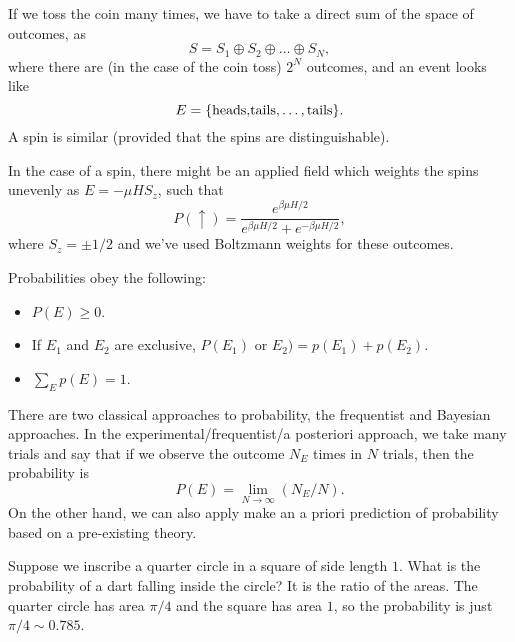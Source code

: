 If we toss the coin many times, we have to take a direct sum of the space of outcomes, as
\begin{equation}
    S=S_1 \oplus S_2 \oplus \dots \oplus S_N,
\end{equation}
where there are (in the case of the coin toss) $2^N$ outcomes, and an event looks like
\begin{equation}
    E=\{\text{heads,tails,}\dots,\text{tails}\}.
\end{equation}
A spin is similar (provided that the spins are distinguishable).

In the case of a spin, there might be an applied field which weights the spins unevenly as $E=-\mu HS_z$, such that
\begin{equation}
    P(\uparrow) = \frac{e^{\beta \mu H/2}}{e^{\beta \mu H/2} + e^{-\beta \mu H/2}},
\end{equation}
where $S_z=\pm 1/2$ and we've used Boltzmann weights for these outcomes.

Probabilities obey the following:
\begin{itemize}
    \item $P(E)\geq 0$.
    \item If $E_1$ and $E_2$ are exclusive, $P(E_1)\text{ or }E_2)=p(E_1)+p(E_2)$.
    \item $\sum_E p(E)=1$.
\end{itemize}

There are two classical approaches to probability, the frequentist and Bayesian approaches. In the experimental/frequentist/a posteriori approach, we take many trials and say that if we observe the outcome $N_E$ times in $N$ trials, then the probability is
\begin{equation}
    P(E) = \lim_{N\to \infty} (N_E/N).
\end{equation}
On the other hand, we can also apply make an a priori prediction of probability based on a pre-existing theory.
\begin{exm}
    Suppose we inscribe a quarter circle in a square of side length $1$. What is the probability of a dart falling inside the circle? It is the ratio of the areas. The quarter circle has area $\pi/4$ and the square has area $1$, so the probability is just $\pi/4 \sim 0.785$.
\end{exm}